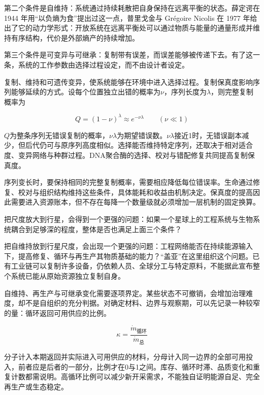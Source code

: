 第二个条件是自维持：系统通过持续耗散把自身保持在远离平衡的状态。薛定谔在 1944 年用“以负熵为食”提出过这一点，普里戈金与 Gr\'egoire Nicolis 在 1977 年给出了它的动力学形式：开放系统在远离平衡处可以通过物质与能量的通量形成并维持有序结构，代价是外部熵产的持续增加。\cite{schrodinger1944,nicolis1977,prigogine1977nobel}

第三个条件是可变异与可继承：复制带有误差，而误差能够被传递下去。有了这一条，系统的工作参数由选择过程设定，而不由设计者设定。

复制、维持和可遗传变异，使系统能够在环境中进入选择过程。复制保真度影响序列能够延续的方式。设每个位置独立出错的概率为$\nu$，序列长度为$\lambda$，则完整复制概率为

\begin{equation}
Q=(1-\nu)^{\lambda}\approx e^{-\nu\lambda}\qquad(\nu\ll1)
\end{equation}

$Q$为整条序列无错误复制的概率，$\nu\lambda$为期望错误数。$\nu\lambda$接近1时，无错误副本减少，但后代仍可与原序列高度相似。选择能否维持特定序列，还取决于相对适合度、变异网络与种群过程。DNA聚合酶的选择、校对与错配修复共同提高复制保真度。\cite{kunkel2000dna,gilbert1986}

序列变长时，要保持相同的完整复制概率，需要相应降低每位错误率。生命通过修复、校对与组织结构维持这些条件，具体能耗和收益由机制决定。保真度的提高因此需要进入资源账本，但不存在每降一个数量级就必须增加一层机制的固定换算。


把尺度放大到行星，会得到一个更强的问题：如果一个星球上的工程系统与生物系统耦合到足够深的程度，整体是否也满足上面三个条件？

把自维持放到行星尺度，会出现一个更强的问题：工程网络能否在持续能源输入下，提高修复、循环与再生产其物质基础的能力？“盖亚”在这里组织这个问题。已有工业链可以复制许多设备，仍依赖人员、全球分工与特定原料，不能据此宣布整个系统已能从原始资源独立复制自身。

自维持、再生产与可继承变化需要逐项界定。某些状态不可撤销，会增加治理难度，却不是自组织的充分判据。对确定材料、边界与观察期，可以先记录一种较窄的量：循环返回可用供应的比例。

\begin{equation}
\kappa=\frac{\dot m_{\text{循环}}}{\dot m_{\text{总}}}
\end{equation}

分子计入本期返回并实际进入可用供应的材料，分母计入同一边界的全部可用投入，前者应是后者的一部分，比例才在0与1之间。库存、循环时滞、品质变化和重复计数都需说明。高循环比例可以减少新开采需求，不能独自证明能源自足、完全再生产或生态稳定。

